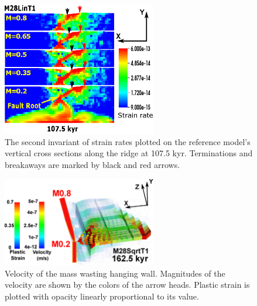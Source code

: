 \documentclass[draft,gc]{agutex}
\begin{document}
\begin{figure}[h]
\noindent\includegraphics[width=0.6\textwidth]{./Figures/fig_Results1_2.eps}
  \caption[The second invariant of strain rates plotted on the reference model's vertical cross sections along the ridge at 107.5 kyr.]{The second invariant of strain rates plotted on the reference model's vertical cross sections along the ridge at 107.5 kyr. Terminations and breakaways are marked by black and red arrows.}
 \label{fig_Results1_2}
\end{figure}   

\begin{figure}[h]
\noindent\includegraphics[width=0.6\textwidth]{./Figures/fig_Results_3_2_5_Cut-back_velocity.eps}
  \caption[Velocity of the mass wasting hanging wall.]{Velocity of the mass wasting hanging wall. Magnitudes of the velocity are shown by the colors of the arrow heads. Plastic strain is plotted with opacity linearly proportional to its value.}
 \label{fig_Results_3_2_5_Cut-back_velocity}
\end{figure}   
\end{document}
